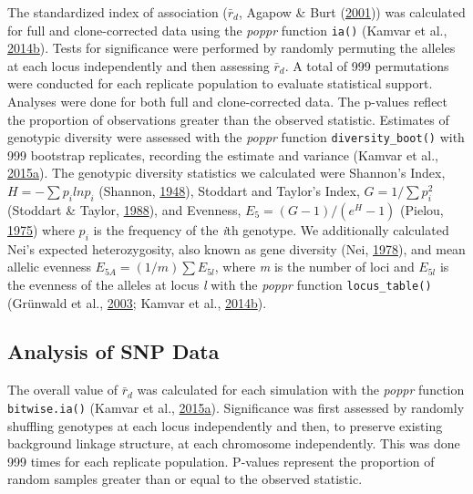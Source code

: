 \documentclass[double,11pt]{beavtex}
\begin{document}
  The standardized index of association (\(\bar{r}_d\), Agapow \& Burt
  (\protect\hyperlink{ref-Agapow_2001}{2001})) was calculated for full and
  clone-corrected data using the \emph{poppr} function \texttt{ia()}
  (Kamvar et al.,
  \protect\hyperlink{ref-kamvar2014poppr}{2014}\protect\hyperlink{ref-kamvar2014poppr}{b}).
  Tests for significance were performed by randomly permuting the alleles
  at each locus independently and then assessing \(\bar{r}_d\). A total of
  999 permutations were conducted for each replicate population to
  evaluate statistical support. Analyses were done for both full and
  clone-corrected data. The p-values reflect the proportion of
  observations greater than the observed statistic. Estimates of genotypic
  diversity were assessed with the \emph{poppr} function
  \texttt{diversity\_boot()} with 999 bootstrap replicates, recording the
  estimate and variance (Kamvar et al.,
  \protect\hyperlink{ref-kamvar2015novel}{2015}\protect\hyperlink{ref-kamvar2015novel}{a}).
  The genotypic diversity statistics we calculated were Shannon's Index,
  \(H = -\sum p_i ln p_i\) (Shannon,
  \protect\hyperlink{ref-shannon2001mathematical}{1948}), Stoddart and
  Taylor's Index, \(G = 1/\sum p_i^2\) (Stoddart \& Taylor,
  \protect\hyperlink{ref-stoddart1988genotypic}{1988}), and Evenness,
  \(E_5 = (G - 1)/(e^H - 1)\) (Pielou,
  \protect\hyperlink{ref-pielou1975ecological}{1975}) where \(p_i\) is the
  frequency of the \emph{i}th genotype. We additionally calculated Nei's
  expected heterozygosity, also known as gene diversity (Nei,
  \protect\hyperlink{ref-Nei:1978}{1978}), and mean allelic evenness
  \(E_{5A} = (1/m) \sum E_{5l}\), where \emph{m} is the number of loci and
  \(E_{5l}\) is the evenness of the alleles at locus \emph{l} with the
  \emph{poppr} function \texttt{locus\_table()} (Grünwald et al.,
  \protect\hyperlink{ref-grunwald2003analysis}{2003}; Kamvar et al.,
  \protect\hyperlink{ref-kamvar2014poppr}{2014}\protect\hyperlink{ref-kamvar2014poppr}{b}).
  
  \subsection{Analysis of SNP Data}\label{analysis-of-snp-data}
  
  The overall value of \(\bar{r}_d\) was calculated for each simulation
  with the \emph{poppr} function \texttt{bitwise.ia()} (Kamvar et al.,
  \protect\hyperlink{ref-kamvar2015novel}{2015}\protect\hyperlink{ref-kamvar2015novel}{a}).
  Significance was first assessed by randomly shuffling genotypes at each
  locus independently and then, to preserve existing background linkage
  structure, at each chromosome independently. This was done 999 times for
  each replicate population. P-values represent the proportion of random
  samples greater than or equal to the observed statistic.
  
\end{document}
